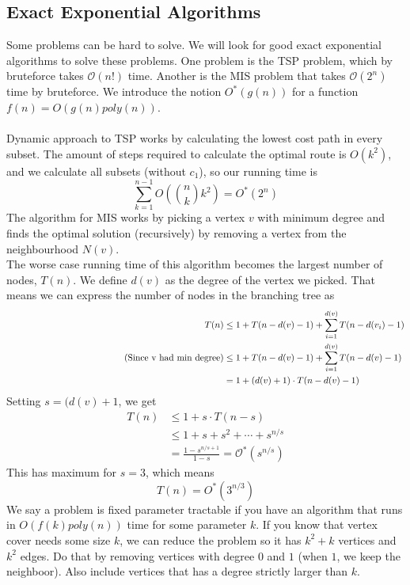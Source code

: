 \documentclass[a4paper]{article}
\author{Nikolaj Dybdahl Rathcke (rfq695)}
\newcommand{\comment}[1]{%
  \text{\phantom{(#1)}} \tag{#1}}
\begin{document}
\begin{center}
\section*{Exact Exponential Algorithms}
\end{center}
Some problems can be hard to solve. We will look for good exact exponential algorithms to solve these problems. One problem is the TSP problem, which by bruteforce takes $\mathcal{O}(n!)$ time. Another is the MIS problem that takes $\mathcal{O}(2^n)$ time by bruteforce. We introduce the notion $O^*(g(n))$ for a function $f(n)=O(g(n)poly(n))$. \\
\\
Dynamic approach to TSP works by calculating the lowest cost path in every subset. The amount of steps required to calculate the optimal route is $O(k^2)$, and we calculate all subsets (without $c_1$), so our running time is
$$\sum_{k=1}^{n-1}O(\binom{n}{k}k^2)=O^*(2^n)$$
The algorithm for MIS works by picking a vertex $v$ with minimum degree and finds the optimal solution (recursively) by removing a vertex from the neighbourhood $N(v)$.\\
The worse case running time of this algorithm becomes the largest number of nodes, $T(n)$. We define $d(v)$ as the degree of the vertex we picked. That means we can express the number of nodes in the branching tree as
\begin{align*}
T(n)&\leq 1+T(n-d(v)-1)+\sum_{i=1}^{d(v)}T(n-d(v_i)-1) \\
\comment{Since v had min degree} &\leq 1+T(n-d(v)-1)+\sum_{i=1}^{d(v)}T(n-d(v)-1) \\
&=1+(d(v)+1)\cdot T(n-d(v)-1)
\end{align*}
Setting $s=(d(v)+1$, we get
\begin{align*}
T(n)&\leq 1+s\cdot T(n-s) \\
&\leq 1+s+s^2+\cdots+s^{n/s} \\
&=\frac{1-s^{n/s+1}}{1-s}=\mathcal{O}^*(s^{n/s})
\end{align*}
This has maximum for $s=3$, which means
$$T(n)=O^*(3^{n/3})$$
We say a problem is fixed parameter tractable if you have an algorithm that runs in $O(f(k)poly(n))$ time for some parameter $k$. If you know that vertex cover needs some size $k$, we can reduce the problem so it has $k^2+k$ vertices and $k^2$ edges. Do that by removing vertices with degree $0$ and $1$ (when $1$, we keep the neighboor). Also include vertices that has a degree strictly larger than $k$.
\end{document}

